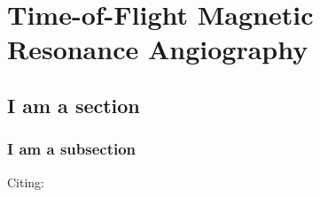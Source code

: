 \chapter{Time-of-Flight Magnetic Resonance Angiography}


\section{I am a section}



\subsection{I am a subsection}

Citing: \cite{Sample2016}

